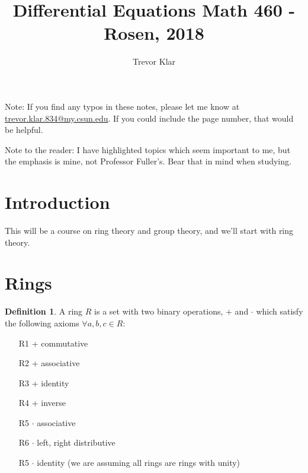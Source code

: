 \documentclass[a5paper]{article}
\title{Differential Equations Math 460 - Rosen, 2018}
\author{Trevor Klar}
\theoremstyle{definition}%
\newtheorem*{definition*}{Definition}
\numberwithin{exercise}{section}
\theoremstyle{remark}%
\begin{document}
\maketitle

\tableofcontents



\begin{highlight}
Note: If you find any typos in these notes, please let me know at \\ \href{mailto:trevor.klar.834@my.csun.edu}{trevor.klar.834@my.csun.edu}. If you could include the page number, that would be helpful. 

Note to the reader: I have highlighted topics which seem important to me, but the emphasis is mine, not Professor Fuller's. Bear that in mind when studying. 
\end{highlight}

\pagebreak
\section{Introduction}

This will be a course on ring theory and group theory, and we'll start with ring theory.

\section{Rings}

\begin{highlight}
\begin{definition*}
A ring $R$ is a set with two binary operations, $+$ and $\cdot$ which satisfy the following axioms $\forall a,b,c\in R $:
\begin{itemize}
\item[R1] + commutative
\item[R2] + associative
\item[R3] + identity
\item[R4] + inverse
\item[R5] $\cdot $ associative
\item[R6] $\cdot $ left, right distributive
\item[R5] $\cdot $ identity (we are assuming all rings are rings with unity)
\end{itemize}
\end{definition*}
\end{highlight}
\end{document}
